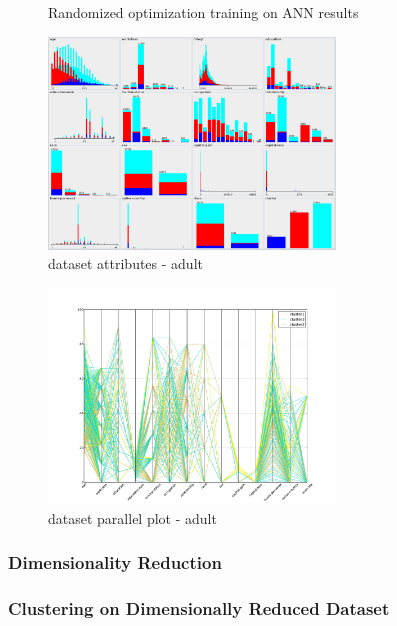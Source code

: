 \documentclass{sig-alternate}
\begin{document}
\begin{figure}[!htbp]
    \centering
    \theverbbox
    \caption{Randomized optimization training on ANN results\label{kmeans-summary}}
\end{figure}


\begin{figure}[!htbp]
    \centering
    \includegraphics[width=3in]{part2/adult/attr-cluster.pdf}
    \caption{dataset attributes - adult\label{adult-attr-cluster}}
\end{figure} 

\begin{figure}[!htbp]
    \centering
    \includegraphics[width=3in]{part2/adult/parallel-cluster.pdf}
    \caption{dataset parallel plot - adult\label{adult-parallel-cluster}}
\end{figure} 


\subsubsection{Dimensionality Reduction}


\subsubsection{Clustering on Dimensionally Reduced Dataset}
\end{document}
